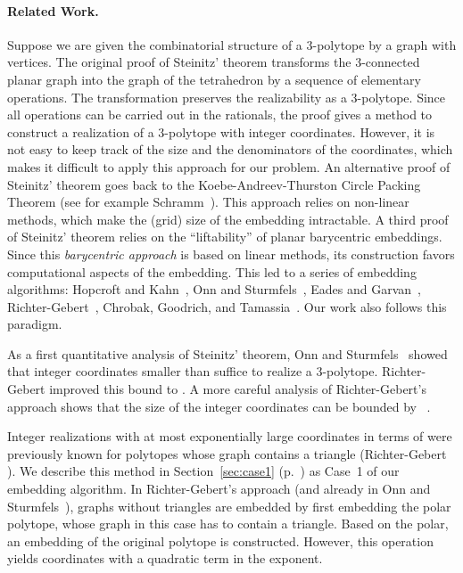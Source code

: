 \documentclass{article}
\theoremstyle{plain} \newtheorem{thm}{Theorem}[section]
\begin{document}
\paragraph{Related Work.}
Suppose we are given the combinatorial structure of a 3-polytope by
a graph 
with  vertices.
The original proof of Steinitz' theorem transforms the
3-connected planar graph  into the graph of the tetrahedron by a
sequence of elementary operations.
The transformation preserves the realizability as a 3-polytope. Since all operations can be carried out in the rationals, the proof gives a method to construct a realization of a 3-polytope with integer coordinates. However, it is not easy to keep track of the size and the denominators of the coordinates, which makes it difficult to apply this approach for our problem. An alternative proof of Steinitz' theorem goes back to the Koebe-Andreev-Thurston Circle Packing Theorem (see for example Schramm~\cite{s-eupsc-91}). This
approach relies on non-linear methods, which make the (grid) size of the embedding intractable. 
A third proof of Steinitz' theorem relies on the ``liftability''  of planar barycentric embeddings. Since this \emph{barycentric approach} is based on linear methods, its construction favors computational aspects of the embedding.  
This led to a series of embedding algorithms: Hopcroft and Kahn~\cite{hk-prga-92}, Onn and Sturmfels~\cite{os-qst-94}, Eades and Garvan~\cite{eg-dspgt-95}, Richter-Gebert~\cite{rg-rsp-96}, 
Chrobak, Goodrich, and Tamassia~\cite{cgt-cdgtt-96}.
Our work also follows this paradigm.

As a first quantitative analysis of Steinitz' theorem, Onn and Sturmfels~\cite{os-qst-94} showed that integer coordinates smaller than  suffice to realize a 3-polytope. 
Richter-Gebert improved this bound to . A more careful analysis of Richter-Gebert's approach shows that the size of the integer coordinates can be bounded by ~\cite{r-rcpps-06}.


Integer realizations with at most exponentially large 
coordinates in terms of  
were previously known for polytopes whose graph contains a
triangle (Richter-Gebert  \cite{rg-rsp-96}). We describe this method in Section~\ref{sec:case1} (p.~\pageref{sec:case1}) as  Case~1
of our embedding algorithm.
In Richter-Gebert's approach (and already in
Onn and Sturmfels~\cite{os-qst-94}),
 graphs without triangles are embedded by first embedding the polar polytope, whose graph in this case has to contain a triangle. Based on the polar, an embedding of the original polytope is constructed. However, this
operation yields coordinates with a quadratic term in the exponent.
\end{document}
